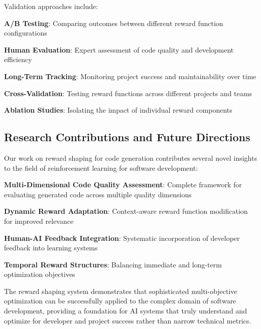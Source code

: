 Validation approaches include:

\begin{expandedlist}
    \item \textbf{A/B Testing}: Comparing outcomes between different reward function configurations
    \item \textbf{Human Evaluation}: Expert assessment of code quality and development efficiency
    \item \textbf{Long-Term Tracking}: Monitoring project success and maintainability over time
    \item \textbf{Cross-Validation}: Testing reward functions across different projects and teams
    \item \textbf{Ablation Studies}: Isolating the impact of individual reward components
\end{expandedlist}

\subsection*{Research Contributions and Future Directions}

Our work on reward shaping for code generation contributes several novel insights to the field of reinforcement learning for software development:

\begin{expandedlist}
    \item \textbf{Multi-Dimensional Code Quality Assessment}: Complete framework for evaluating generated code across multiple quality dimensions
    \item \textbf{Dynamic Reward Adaptation}: Context-aware reward function modification for improved relevance
    \item \textbf{Human-AI Feedback Integration}: Systematic incorporation of developer feedback into learning systems
    \item \textbf{Temporal Reward Structures}: Balancing immediate and long-term optimization objectives
\end{expandedlist}

The reward shaping system demonstrates that sophisticated multi-objective optimization can be successfully applied to the complex domain of software development, providing a foundation for AI systems that truly understand and optimize for developer and project success rather than narrow technical metrics.

